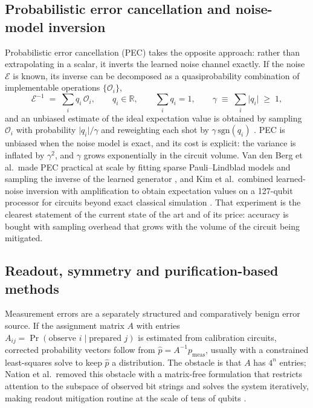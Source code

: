 \documentclass[Thesis.tex]{subfiles}
\begin{document}
\subsection{Probabilistic error cancellation and noise-model inversion}

Probabilistic error cancellation (PEC) takes the opposite approach: rather than
extrapolating in a scalar, it inverts the learned noise channel exactly. If the
noise $\mathcal{E}$ is known, its inverse can be decomposed as a
quasiprobability combination of implementable operations
$\{\mathcal{O}_{i}\}$,
\begin{equation}
  \mathcal{E}^{-1} \;=\; \sum_{i} q_{i}\,\mathcal{O}_{i},
  \qquad q_{i} \in \mathbb{R},
  \qquad \sum_{i} q_{i} = 1,
  \qquad \gamma \;\equiv\; \sum_{i} \lvert q_{i}\rvert \;\ge\; 1,
  \label{eq2:pec}
\end{equation}
and an unbiased estimate of the ideal expectation value is obtained by sampling
$\mathcal{O}_{i}$ with probability $\lvert q_{i}\rvert/\gamma$ and reweighting
each shot by $\gamma\,\mathrm{sgn}(q_{i})$
\cite{temme2017error,endo2018practical}. PEC is unbiased when the noise model
is exact, and its cost is explicit: the variance is inflated by $\gamma^{2}$,
and $\gamma$ grows exponentially in the circuit volume. Van den Berg et al.\
made PEC practical at scale by fitting sparse Pauli--Lindblad models and
sampling the inverse of the learned generator
\cite{vandenberg2023probabilistic}, and Kim et al.\ combined learned-noise
inversion with amplification to obtain expectation values on a 127-qubit
processor for circuits beyond exact classical simulation
\cite{kim2023utility}. That experiment is the clearest statement of the
current state of the art and of its price: accuracy is bought with sampling
overhead that grows with the volume of the circuit being mitigated.

\subsection{Readout, symmetry and purification-based methods}

Measurement errors are a separately structured and comparatively benign error
source. If the assignment matrix $A$ with entries
$A_{ij} = \Pr(\text{observe }i \mid \text{prepared }j)$ is estimated from
calibration circuits, corrected probability vectors follow from
$\hat{p} = A^{-1} p_{\mathrm{meas}}$, usually with a constrained least-squares
solve to keep $\hat{p}$ a distribution. The obstacle is that $A$ has
$4^{n}$ entries; Nation et al.\ removed this obstacle with a
matrix-free formulation that restricts attention to the subspace of observed
bit strings and solves the system iteratively, making readout mitigation
routine at the scale of tens of qubits \cite{nation2021scalable}.
\end{document}
